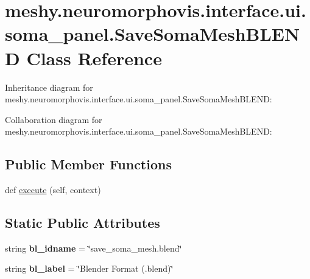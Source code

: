 \hypertarget{classmeshy_1_1neuromorphovis_1_1interface_1_1ui_1_1soma__panel_1_1SaveSomaMeshBLEND}{}\section{meshy.\+neuromorphovis.\+interface.\+ui.\+soma\+\_\+panel.\+Save\+Soma\+Mesh\+B\+L\+E\+ND Class Reference}
\label{classmeshy_1_1neuromorphovis_1_1interface_1_1ui_1_1soma__panel_1_1SaveSomaMeshBLEND}


Inheritance diagram for meshy.\+neuromorphovis.\+interface.\+ui.\+soma\+\_\+panel.\+Save\+Soma\+Mesh\+B\+L\+E\+ND\+:


Collaboration diagram for meshy.\+neuromorphovis.\+interface.\+ui.\+soma\+\_\+panel.\+Save\+Soma\+Mesh\+B\+L\+E\+ND\+:
\subsection*{Public Member Functions}
\begin{DoxyCompactItemize}
\item 
def \hyperlink{classmeshy_1_1neuromorphovis_1_1interface_1_1ui_1_1soma__panel_1_1SaveSomaMeshBLEND_a69505a91018ba8eddf28692057b159c1}{execute} (self, context)
\end{DoxyCompactItemize}
\subsection*{Static Public Attributes}
\begin{DoxyCompactItemize}
\item 
string {\bfseries bl\+\_\+idname} = \char`\"{}save\+\_\+soma\+\_\+mesh.\+blend\char`\"{}\hypertarget{classmeshy_1_1neuromorphovis_1_1interface_1_1ui_1_1soma__panel_1_1SaveSomaMeshBLEND_abfb59af709d6b052fcacdee26a81939a}{}\label{classmeshy_1_1neuromorphovis_1_1interface_1_1ui_1_1soma__panel_1_1SaveSomaMeshBLEND_abfb59af709d6b052fcacdee26a81939a}

\item 
string {\bfseries bl\+\_\+label} = \char`\"{}Blender Format (.blend)\char`\"{}\hypertarget{classmeshy_1_1neuromorphovis_1_1interface_1_1ui_1_1soma__panel_1_1SaveSomaMeshBLEND_ae8f001c4e6d5144607fab23b3c69be35}{}\label{classmeshy_1_1neuromorphovis_1_1interface_1_1ui_1_1soma__panel_1_1SaveSomaMeshBLEND_ae8f001c4e6d5144607fab23b3c69be35}

\end{DoxyCompactItemize}


